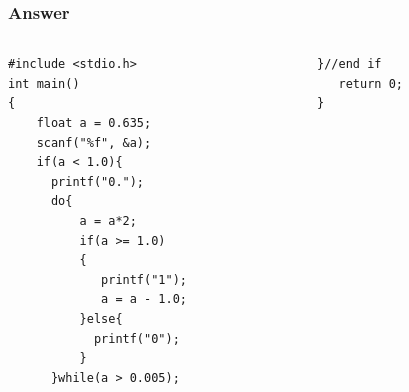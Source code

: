 \ifx\answer{}
\begin{frame}[fragile]
\frametitle{Answer}
\vspace{-0.12in}
\begin{columns}
\begin{column}{0.53\linewidth}
\begin{lstlisting}[xleftmargin=0.02\linewidth]
#include <stdio.h>
int main()
{
    float a = 0.635;
    scanf("%f", &a);
    if(a < 1.0){
      printf("0.");
      do{
	      a = a*2;
          if(a >= 1.0)
    	  {
	         printf("1");
             a = a - 1.0;
          }else{
           	printf("0");
          }
      }while(a > 0.005);
\end{lstlisting}
\end{column}
\begin{column}{0.47\linewidth}
\begin{lstlisting}[firstnumber=18]
   }//end if
   return 0;
}
\end{lstlisting}
\end{column}
\end{columns}
\end{frame}
\fi